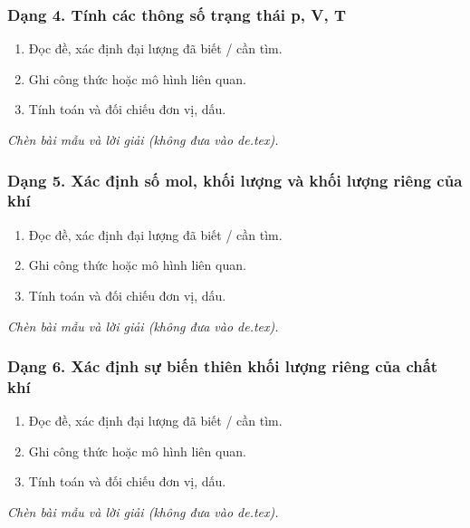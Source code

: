\subsubsection{Dạng 4. Tính các thông số trạng thái p, V, T}
\begin{phuongphap}
\begin{enumerate}
\item Đọc đề, xác định đại lượng đã biết / cần tìm.
\item Ghi công thức hoặc mô hình liên quan.
\item Tính toán và đối chiếu đơn vị, dấu.
\end{enumerate}
\end{phuongphap}
\begin{vidumau}
\textit{Chèn bài mẫu và lời giải (không đưa vào de.tex).}
\end{vidumau}

\subsubsection{Dạng 5. Xác định số mol, khối lượng và khối lượng riêng của khí}
\begin{phuongphap}
\begin{enumerate}
\item Đọc đề, xác định đại lượng đã biết / cần tìm.
\item Ghi công thức hoặc mô hình liên quan.
\item Tính toán và đối chiếu đơn vị, dấu.
\end{enumerate}
\end{phuongphap}
\begin{vidumau}
\textit{Chèn bài mẫu và lời giải (không đưa vào de.tex).}
\end{vidumau}

\subsubsection{Dạng 6. Xác định sự biến thiên khối lượng riêng của chất khí}
\begin{phuongphap}
\begin{enumerate}
\item Đọc đề, xác định đại lượng đã biết / cần tìm.
\item Ghi công thức hoặc mô hình liên quan.
\item Tính toán và đối chiếu đơn vị, dấu.
\end{enumerate}
\end{phuongphap}
\begin{vidumau}
\textit{Chèn bài mẫu và lời giải (không đưa vào de.tex).}
\end{vidumau}

